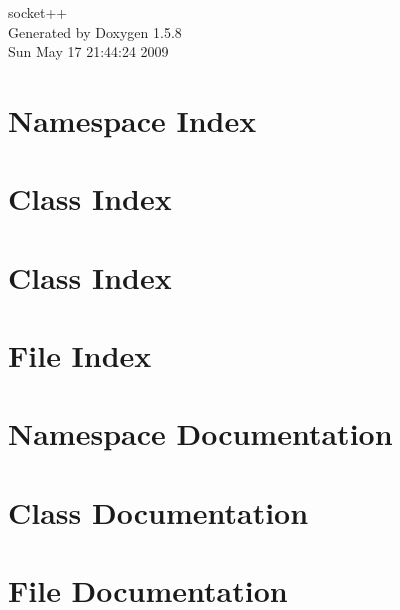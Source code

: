 \documentclass[a4paper]{book}
\begin{document}
\begin{titlepage}
\vspace*{7cm}
\begin{center}
{\Large socket++ }\\
\vspace*{1cm}
{\large Generated by Doxygen 1.5.8}\\
\vspace*{0.5cm}
{\small Sun May 17 21:44:24 2009}\\
\end{center}
\end{titlepage}
\clearemptydoublepage
{}
\tableofcontents
\clearemptydoublepage
{}
\chapter{Namespace Index}

\chapter{Class Index}

\chapter{Class Index}

\chapter{File Index}

\chapter{Namespace Documentation}


\chapter{Class Documentation}






















\chapter{File Documentation}
















\printindex
\end{document}
